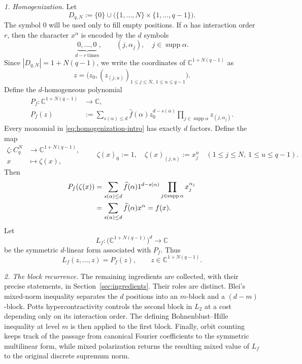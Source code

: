 \documentclass[11pt,a4paper]{article}
\numberwithin{equation}{section}
\theoremstyle{cleanplain}
\theoremstyle{cleandefinition}
\theoremstyle{cleanremark}
\newcommand{\C}{\mathbb C}
\newcommand{\supp}{\operatorname{supp}}
\begin{document}
\medskip
\noindent\emph{1. Homogenization.}
Let
\begin{equation}\label{eq:decorated-set-intro}
 D_{q,N}:=\{0\}\cup\bigl(\{1,\ldots,N\}\times\{1,\ldots,q-1\}\bigr).
\end{equation}
The symbol $0$ will be used only to fill empty positions.  If
$\alpha$ has interaction order $r$, then the character $x^\alpha$ is encoded
by the $d$ symbols
\[
 \underbrace{0,\ldots,0}_{d-r\ \mathrm{times}},
 \qquad
 (j,\alpha_j),\quad j\in\supp\alpha.
\]
Since $|D_{q,N}|=1+N(q-1)$, we write the coordinates of
$\C^{1+N(q-1)}$ as
\[
 z=\bigl(z_0,(z_{(j,u)})_{1\leq j\leq N,\ 1\leq u\leq q-1}\bigr).
\]
Define the $d$-homogeneous polynomial
\begin{equation}\label{eq:homogenization-intro}
 \begin{aligned}
 P_f:\C^{1+N(q-1)}&\longrightarrow\C,\\
 P_f(z)&:=
 \sum_{s(\alpha)\leq d}\widehat f(\alpha)
 z_0^{d-s(\alpha)}
 \prod_{j\in\supp\alpha}z_{(j,\alpha_j)}.
 \end{aligned}
\end{equation}
Every monomial in \eqref{eq:homogenization-intro} has exactly $d$ factors.
Define the map
\begin{equation}\label{eq:zeta-intro}
 \begin{aligned}
 \zeta:C_q^N&\longrightarrow\C^{1+N(q-1)},\\
 x&\longmapsto\zeta(x),
 \end{aligned}
 \qquad
 \zeta(x)_0:=1,
 \quad
 \zeta(x)_{(j,u)}:=x_j^u
 \quad(1\leq j\leq N,\ 1\leq u\leq q-1).
\end{equation}
Then
\begin{align}
 P_f(\zeta(x))
 &=\sum_{s(\alpha)\leq d}\widehat f(\alpha)
   1^{d-s(\alpha)}
   \prod_{j\in\supp\alpha}x_j^{\alpha_j}\notag\\
 &=\sum_{s(\alpha)\leq d}\widehat f(\alpha)x^\alpha
 =f(x).
 \label{eq:homogenization-recovery-intro}
\end{align}
Let
\begin{equation}\label{eq:Lf-domain-intro}
 L_f:\bigl(\C^{1+N(q-1)}\bigr)^d\longrightarrow\C
\end{equation}
be the symmetric $d$-linear form associated with $P_f$.  Thus
\begin{equation}\label{eq:Lf-intro}
 L_f(z,\ldots,z)=P_f(z),
 \qquad z\in\C^{1+N(q-1)}.
\end{equation}

\medskip
\noindent\emph{2. The block recurrence.}
The remaining ingredients are collected, with their precise statements, in
Section~\ref{sec:ingredients}.  Their roles are distinct.  Blei's mixed-norm
inequality separates the $d$ positions into an $m$-block and a
$(d-m)$-block.  Potts hypercontractivity controls the second block in
$L_2$ at a cost depending only on its interaction order.  The defining
Bohnenblust--Hille inequality at level $m$ is then applied to the first
block.  Finally, orbit counting keeps track of the passage from canonical
Fourier coefficients to the symmetric multilinear form, while mixed
polarization returns the resulting mixed value of $L_f$ to the original
discrete supremum norm.
\end{document}
